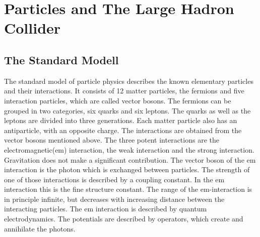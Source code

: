 \chapter{Particles and The Large Hadron Collider}
\label{sec:particleslhc}

\section{The Standard Modell}
\label{sec:sm}

The standard model of particle physics describes the known elementary particles and their interactions. It consists of 12 matter particles, the fermions
and five interaction particles, which are called vector bosons. The
fermions can be grouped in two categories, six quarks and
six leptons. The quarks as well as the leptons are divided into three generations.
Each matter particle also has an antiparticle, with an opposite charge.
The interactions are obtained from the vector bosons mentioned above.
The three potent interactions are the electromagnetic(em) interaction,
the weak interaction and the strong interaction. Gravitation does not make a significant contribution.
The vector boson of the em interaction is the photon which is exchanged between particles.
The strength of one of those interactions is
described by a coupling constant. In the em interaction this is the
fine structure constant\cite{alphas}. The range of the em-interaction is in principle
infinite, but decreases with increasing distance between the interacting particles.
The em interaction is described by quantum electrodynamics.
The potentials are described by operators, which create and annihilate the photons.

